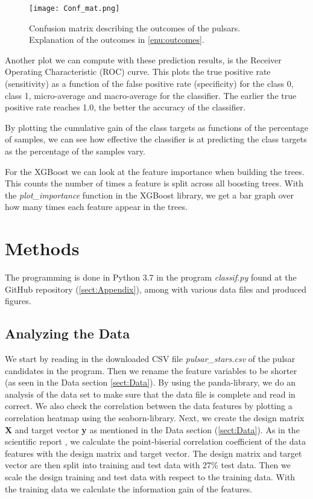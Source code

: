 \documentclass[12pt,a4paper,english]{article}
\begin{document}
\begin{figure}[h!]
	\centering\texttt{[image: Conf\_mat.png]}
	\caption{Confusion matrix describing the outcomes of the pulsars. Explanation of the outcomes in \ref{enu:outcomes}. \label{fig:conf_mat}}
\end{figure} 

Another plot we can compute with these prediction results, is the Receiver Operating Characteristic (ROC) curve. This plots the true positive rate (sensitivity) as a function of the false positive rate (specificity) for the class 0, class 1, micro-average and macro-average for the classifier. The earlier the true positive rate reaches 1.0, the better the accuracy of the classifier.

By plotting the cumulative gain of the class targets as functions of the percentage of samples, we can see how effective the classifier is at predicting the class targets as the percentage of the samples vary.

For the XGBoost we can look at the feature importance when building the trees. This counts the number of times a feature is split across all boosting trees. With the \textit{plot\_importance} function in the XGBoost library, we get a bar graph over how many times each feature appear in the trees.


\section{Methods}
\label{sect:Methods}
The programming is done in Python 3.7 in the program \textit{classif.py} found at the GitHub repository (\ref{sect:Appendix}), among with various data files and produced figures.

\subsection{Analyzing the Data}
\label{subsect:analysis}
We start by reading in the downloaded CSV file \textit{pulsar\_stars.csv} of the pulsar candidates in the program. Then we rename the feature variables to be shorter (as seen in the Data section \ref{sect:Data}). By using the panda-library, we do an analysis of the data set to make sure that the data file is complete and read in correct. We also check the correlation between the data features by plotting a correlation heatmap using the seaborn-library. Next, we create the design matrix \textbf{X} and target vector \textbf{y} as mentioned in the Data section (\ref{sect:Data}). As in the scientific report \cite{pulsar_art}, we calculate the point-biserial correlation coefficient of the data features with the design matrix and target vector. The design matrix and target vector are then split into training and test data with 27\% test data. Then we scale the design training and test data with respect to the training data. With the training data we calculate the information gain of the features.
\end{document}
